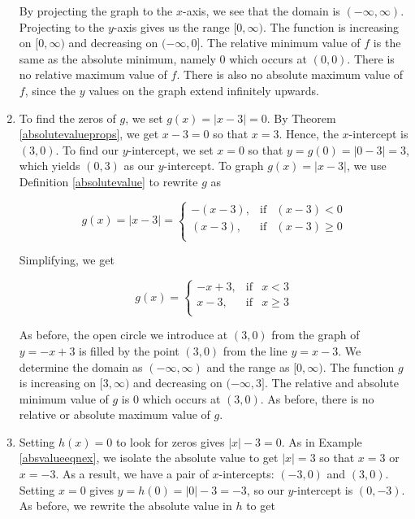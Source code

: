 \begin{ex}
\begin{enumerate}
\begin{center}
\end{center}

By projecting the graph to the $x$-axis, we see that the domain is $(-\infty, \infty)$.  Projecting to the $y$-axis gives us the range $[0,\infty)$.  The function is increasing on $[0,\infty)$ and decreasing on $(-\infty,0]$.  The relative minimum value of $f$ is the same as the absolute minimum, namely $0$ which occurs at $(0,0)$.  There is no relative maximum value of $f$.  There is also no absolute maximum value of $f$, since the $y$ values on the graph extend infinitely upwards.

\item  To find the zeros of $g$, we set $g(x) = |x-3|=0$.  By Theorem \ref{absolutevalueprops}, we get $x-3=0$ so that $x=3$.  Hence, the $x$-intercept is $(3,0)$.  To find our $y$-intercept, we set $x=0$ so that $y = g(0) = |0-3| = 3$, which yields $(0,3)$ as our $y$-intercept.  To graph $g(x) = |x-3|$, we use Definition \ref{absolutevalue} to rewrite $g$ as

\[ g(x) = |x-3| =  \left\{ \begin{array}{rcl} -(x-3), & \mbox{if} & (x-3) < 0  \\ (x-3), & \mbox{if} & (x -3) \geq 0 \\ \end{array} \right.\]

Simplifying, we get

\[ g(x) =\left\{ \begin{array}{rcl} -x+3, & \mbox{if} & x<3  \\ x-3, & \mbox{if} & x \geq 3 \\ \end{array} \right.\]



As before, the open circle we introduce at $(3,0)$ from the graph of $y = -x+3$ is filled by the point $(3,0)$ from the line $y = x-3$. We determine the domain as $(-\infty, \infty)$ and the range as $[0,\infty)$.  The function $g$ is increasing on $[3,\infty)$ and decreasing on $(-\infty,3]$.  The relative and absolute minimum value of $g$ is $0$ which occurs at $(3,0)$.  As before, there is no relative or absolute maximum value of $g$.

\item  Setting $h(x) = 0$ to look for zeros gives $|x|-3=0$. As in Example \ref{absvalueeqnex},  we isolate the absolute value to get  $|x| = 3$ so that $x =3$ or $x=-3$.  As a result, we have a pair of $x$-intercepts:  $(-3,0)$ and $(3,0)$.  Setting $x=0$ gives $y = h(0) = |0|-3 = -3$, so our $y$-intercept is $(0,-3)$.  As before, we rewrite the absolute value in $h$ to get


\end{enumerate}
\end{ex}
